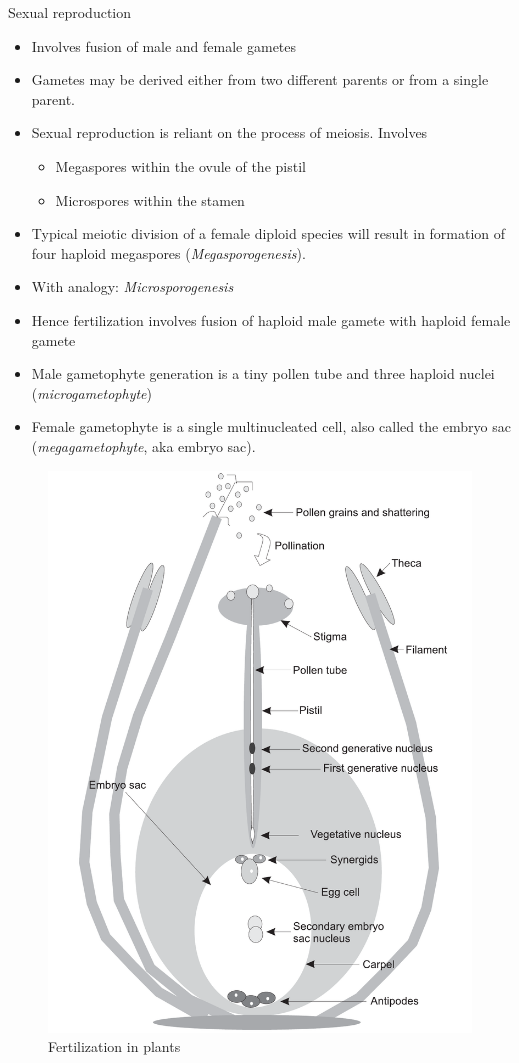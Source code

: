 \documentclass[11pt,ignorenonframetext,aspectratio=169]{beamer}
\providecommand{\tightlist}{%
  \setlength{\itemsep}{0pt}\setlength{\parskip}{0pt}}
\begin{document}
\begin{frame}{Sexual reproduction}
\protect\hypertarget{sexual-reproduction}{}
\begin{itemize}
\tightlist
\item
  Involves fusion of male and female gametes
\item
  Gametes may be derived either from two different parents or from a
  single parent.
\item
  Sexual reproduction is reliant on the process of meiosis. Involves

  \begin{itemize}
  \tightlist
  \item
    Megaspores within the ovule of the pistil
  \item
    Microspores within the stamen
  \end{itemize}
\item
  Typical meiotic division of a female diploid species will result in
  formation of four haploid megaspores (\emph{Megasporogenesis}).
\item
  With analogy: \emph{Microsporogenesis}
\item
  Hence fertilization involves fusion of haploid male gamete with
  haploid female gamete
\item
  Male gametophyte generation is a tiny pollen tube and three haploid
  nuclei (\emph{microgametophyte})
\item
  Female gametophyte is a single multinucleated cell, also called the
  embryo sac (\emph{megagametophyte}, aka embryo sac).
\end{itemize}
\end{frame}

\begin{frame}{}
\protect\hypertarget{section-1}{}
\begin{figure}

{\centering \includegraphics[width=0.38\linewidth]{./images/fertilization_in_self_pollinated_species} 

}

\caption{Fertilization in plants}\label{fig:plant-fertilization}
\end{figure}
\end{frame}
\end{document}
